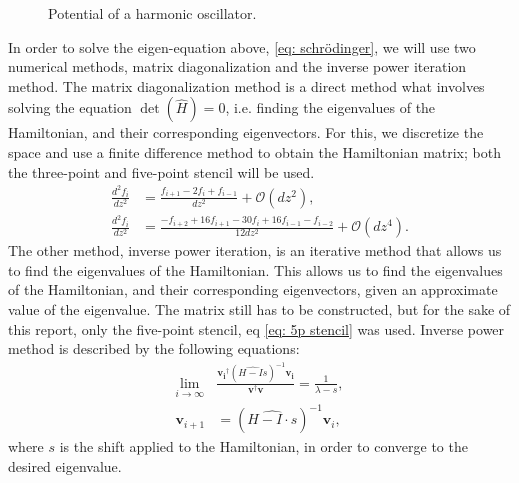 \documentclass[a4paper]{article}
\newcommand{\w}{\omega}
\begin{document}
\begin{figure}[H]
    \centering
    \caption{Potential of a harmonic oscillator.}
    \label{fig: harmonic oscillator potential}
\end{figure}\noindent
In order to solve the eigen-equation above, \eqref{eq: schrödinger}, we will use two numerical methods, matrix diagonalization and the inverse power iteration method.
The matrix diagonalization method is a direct method what involves solving the equation $\det(\hat{H}) = 0$, i.e. finding the eigenvalues of the Hamiltonian, and their corresponding eigenvectors.
For this, we discretize the space and use a finite difference method to obtain the Hamiltonian matrix; both the three-point and five-point stencil will be used. 
\begin{align}
    \frac{d^2 f_i}{dz^2} &= \frac{f_{i+1} - 2f_i + f_{i-1}}{dz^2} + \mathcal{O}(dz^2),\label{eq: 3p stencil}\\
    \frac{d^2 f_i}{dz^2} &= \frac{-f_{i + 2} + 16f_{i+1} - 30f_i + 16f_{i-1} - f_{i - 2}}{12dz^2} + \mathcal{O}(dz^4).\label{eq: 5p stencil}
\end{align}The other method, inverse power iteration, is an iterative method that allows us to find the eigenvalues of the Hamiltonian.
This allows us to find the eigenvalues of the Hamiltonian, and their corresponding eigenvectors, given an approximate value of the eigenvalue. The matrix still has to be constructed, but for the sake of this report, only the five-point stencil, eq \eqref{eq: 5p stencil} was used.
Inverse power method is described by the following equations:
\begin{align}
    \lim_{i\to\infty}&\frac{\mathbf{v_i}^\dagger (\hat{H - Is})^{-1}\mathbf{v_i}}{\mathbf{v}^\dagger\mathbf{v}} = \frac{1}{\lambda - s},\label{eq: inverse power iteration1}\\
    \mathbf{v}_{i + 1} &= (\hat{H - I\cdot s})^{-1}\mathbf{v}_i,\label{eq: inverse power iteration2}
\end{align}where $s$ is the shift applied to the Hamiltonian, in order to converge to the desired eigenvalue.
\end{document}
